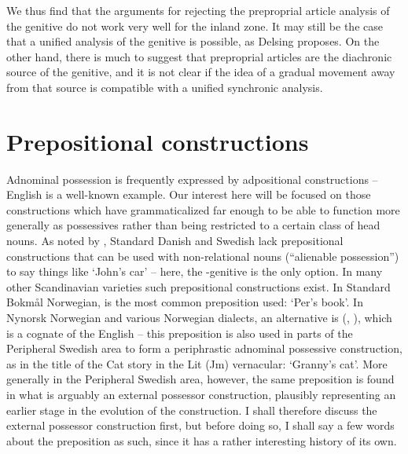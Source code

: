 
We thus find that the arguments for rejecting the preproprial article analysis of the genitive do not work very well for the inland zone. It may still be the case that a unified analysis of the genitive is possible, as Delsing proposes. On the other hand, there is much to suggest that preproprial articles are the diachronic source of the genitive, and it is not clear if the idea of a gradual movement away from that source is compatible with a unified synchronic analysis. 


\section{Prepositional constructions}
\label{bkm:Ref136433022}
Adnominal possession is frequently expressed by adpositional constructions – English is a well-known example. Our interest here will be focused on those constructions which have grammaticalized far enough to be able to function more generally as possessives rather than being restricted to a certain class of head nouns. As noted by \citet[43]{Delsing2003a}, Standard Danish and Swedish lack prepositional constructions that can be used with non-relational nouns (“alienable possession”) to say things like ‘John’s car’ – here, the -genitive is the only option. In many other Scandinavian varieties such prepositional constructions exist. In Standard Bokmål Norwegian,  is the most common preposition used:  ‘Per’s book’. In Nynorsk Norwegian and various Norwegian dialects, an alternative is (\citet[263]{FaarlundEtAl1997}, \citet[43]{Delsing2003a}), which is a cognate of the English  – this preposition is also used in parts of the Peripheral Swedish area to form a periphrastic adnominal possessive construction, as in the title of the Cat story in the Lit (Jm) vernacular: ‘Granny’s cat’. More generally in the Peripheral Swedish area, however, the same preposition is found in what is arguably an external possessor construction, plausibly representing an earlier stage in the evolution of the construction. I shall therefore discuss the external possessor construction first, but before doing so, I shall say a few words about the preposition as such, since it has a rather interesting history of its own. 

